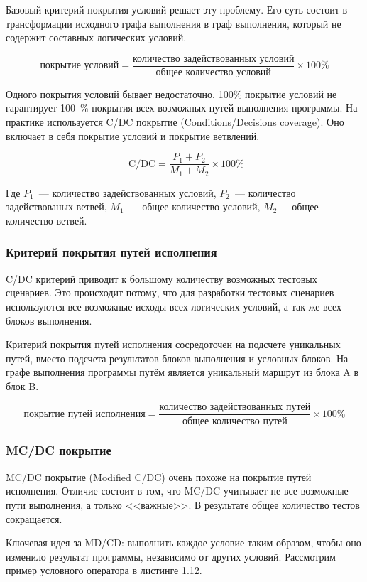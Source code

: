 Базовый критерий покрытия условий решает эту проблему. Его суть состоит в трансформации исходного графа выполнения в граф выполнения, который не содержит составных логических условий. 

\[ \text{покрытие условий} = \frac{\text{количество задействованных условий}}{\text{общее количество условий}}  \times 100 \% \]

Одного покрытия условий бывает недостаточно. 100\% покрытие условий не гарантирует 100~\% покрытия всех возможных путей выполнения программы. На практике используется C/DC покрытие (Conditions/Decisions coverage). Оно включает в себя покрытие условий и покрытие ветвлений.

\[ \text{ C/DC} = \frac{P_1 + P_2}{M_1 + M_2} \times 100 \% \]

Где \(P_1\)~--- количество задействованных условий, \(P_2\)~--- количество задействованых ветвей, \(M_1\)~--- общее количество условий, \(M_2\)~---общее количество ветвей.

\subsubsection{Критерий покрытия путей исполнения}

C/DC критерий приводит к большому количеству возможных тестовых сценариев. Это происходит потому, что для разработки тестовых сценариев используются все возможные исходы всех логических условий, а так же всех блоков выполнения.

Критерий покрытия путей исполнения сосредоточен на подсчете уникальных путей, вместо подсчета результатов блоков выполнения и условных блоков. На графе выполнения программы путём является уникальный маршрут из блока A в блок B.

\[ \text{покрытие путей исполнения} = \frac{\text{количество задействованных путей}}{\text{общее количество путей}}  \times 100 \% \]

\subsubsection{MC/DC покрытие}

MC/DC покрытие (Modified C/DC) очень похоже на покрытие путей исполнения. Отличие состоит в том, что MC/DC учитывает не все возможные пути выполнения, а только <<важные>>. В результате общее количество тестов сокращается.

Ключевая идея за MD/CD: выполнить каждое условие таким образом, чтобы оно изменило результат программы, независимо от других условий. Рассмотрим пример условного оператора в листинге 1.12.

